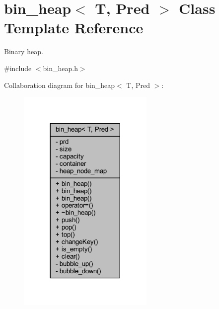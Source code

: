 \hypertarget{classbin__heap}{}\section{bin\+\_\+heap$<$ T, Pred $>$ Class Template Reference}
\label{classbin__heap}


Binary heap.  




{\ttfamily \#include $<$bin\+\_\+heap.\+h$>$}



Collaboration diagram for bin\+\_\+heap$<$ T, Pred $>$\+:\nopagebreak
\begin{figure}[H]
\begin{center}
\leavevmode
\includegraphics[width=185pt]{classbin__heap__coll__graph}
\end{center}
\end{figure}
